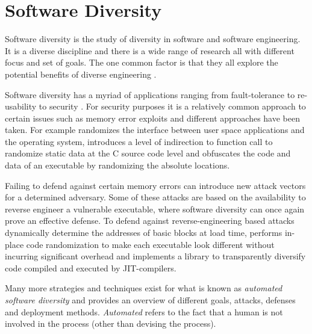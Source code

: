 \section{Software Diversity}

Software diversity is the study of diversity in software and software engineering. It is
a diverse discipline and there is a wide range of research all with different focus and
set of goals. The one common factor is that they all explore the potential benefits of
diverse engineering \cite{survey}.

Software diversity has a myriad of applications ranging from fault-tolerance to re-usability
to security \cite{survey}. For security purposes it is a relatively common approach to
certain issues such as memory error exploits and different approaches have been taken.
For example \textcite{os-randomization} randomizes the interface between user space
applications and the operating system, \textcite{mem-exploits} introduces a level of
indirection to function call to randomize static data at the C source code level and
\textcite{add-obfuscation} obfuscates the code and data of an executable by randomizing
the absolute locations.

Failing to defend against certain memory errors can introduce new attack vectors for a
determined adversary. Some of these attacks are based on the availability to reverse engineer
a vulnerable executable, where software diversity can once again prove an effective defense.
To defend against reverse-engineering based attacks \textcite{binary-stirring} dynamically
determine the addresses of basic blocks at load time, \textcite{smashing-gadgets} performs
in-place code randomization to make each executable look different without incurring
significant overhead and \textcite{librando} implements a library to transparently
diversify code compiled and executed by JIT-compilers.

Many more strategies and techniques exist for what is known as
\textit{automated software diversity} and \textcite{SoK} provides an overview of different
goals, attacks, defenses and deployment methods. \textit{Automated} refers to the fact that
a human is not involved in the process (other than devising the process).


